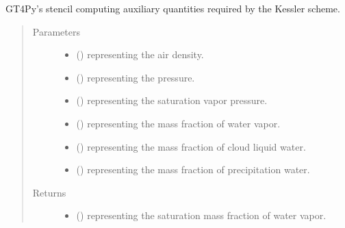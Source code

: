 \documentclass[letterpaper,10pt,english]{sphinxmanual}
\begin{document}
\begin{fulllineitems}
\begin{fulllineitems}
\label{\detokenize{api:parameterizations.adjustment_microphysics.AdjustmentMicrophysicsKessler._stencil_auxiliary_defs}}
GT4Py’s stencil computing auxiliary quantities required by the Kessler scheme.
\begin{quote}\begin{description}
\item[{Parameters}] \leavevmode\begin{itemize}
\item {} 
 () \textendash{}  representing the air density.

\item {} 
 () \textendash{}  representing the pressure.

\item {} 
 () \textendash{}  representing the saturation vapor pressure.

\item {} 
 () \textendash{}  representing the mass fraction of water vapor.

\item {} 
 () \textendash{}  representing the mass fraction of cloud liquid water.

\item {} 
 () \textendash{}  representing the mass fraction of precipitation water.

\end{itemize}

\item[{Returns}] \leavevmode
\begin{itemize}
\item {} 
 () \textendash{}  representing the saturation mass fraction of water vapor.


\end{itemize}
\end{description}
\end{quote}
\end{fulllineitems}
\end{fulllineitems}
\end{document}
